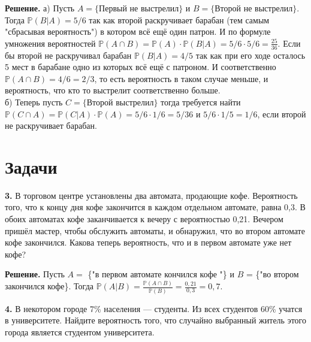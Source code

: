 \begin{solution}\label{solution-conditional-probability-theory-2-method-1}
\textbf{Решение.} а) Пусть $A = \{\text{Первый не выстрелил}\}$ и $B =\{\text{Второй не выстрелил}\}$. Тогда $\mathbb{P}(B\vert A) = 5/6$ так как второй раскручивает барабан (тем самым "сбрасывая вероятность") в котором всё ещё один патрон. И по формуле умножения вероятностей $\mathbb{P}(A\cap B)= \mathbb{P}(A)\cdot \mathbb{P}(B|A) = 5/6 \cdot 5/6 = \frac{25}{36}$. Если бы второй не раскручивал барабан $\mathbb{P}(B\vert A) = 4/5$ так как при его ходе осталось 5 мест в барабане одно из которых всё ещё с патроном. И соответственно $\mathbb{P}(A\cap B) = 4/6 = 2/3$, то есть вероятность в таком случае меньше, и вероятность, что кто то выстрелит соответственно больше.\\
 б) Теперь пусть $C = \{\text{Второй выстрелил}\}$ тогда требуется найти $\mathbb{P}(C\cap A) = \mathbb{P}(C\vert A)\cdot \mathbb{P}(A) = 5/6 \cdot 1/6 = 5/36$ и $5/6\cdot 1/5 = 1/6$, если второй не раскручивает барабан.
\end{solution}

\section{Задачи}

\begin{task}\label{task-problems-1}
\textbf{3.} В торговом центре установлены два автомата, продающие кофе. Вероятность того, что к концу дня кофе закончится в каждом отдельном автомате, равна 0,3. В обоих автоматах кофе заканчивается к вечеру с вероятностью 0,21. Вечером пришёл мастер, чтобы обслужить автоматы, и обнаружил, что во втором автомате кофе закончился. Какова теперь вероятность, что и в первом автомате уже нет кофе?
\end{task}

\begin{solution}\label{solution-conditional-probability-problems-1-method-1}
\textbf{Решение.} Пусть $A=$ \{"в первом автомате кончился кофе "\} и $B$ = \{"во втором закончился кофе\}. Тогда $\mathbb{P}(A\vert B) = \frac{\mathbb{P}(A\cap B)}{\mathbb{P}(B)} = \frac{0,21}{0,3} = 0,7$.
\end{solution}

\begin{task}\label{task-problems-2}
\textbf{4.} В некотором городе 7\% населения — студенты. Из всех студентов 60\% учатся в университете. Найдите вероятность того, что случайно выбранный житель этого города является студентом университета.
\end{task}

